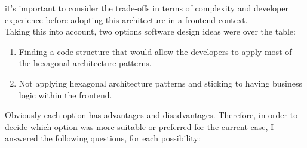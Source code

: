 \documentclass[../design.tex]{subfiles}
\begin{document}
it's important to consider the trade-offs in terms of complexity and developer
experience before adopting this architecture in a frontend context.
\\[8pt]
Taking this into account, two options software design ideas were over the table:
\begin{enumerate}
	\item Finding a code structure that would allow the developers to apply most
	      of the hexagonal architecture patterns.
	\item Not applying hexagonal architecture patterns and sticking to
	      having business logic within the frontend.
\end{enumerate}
Obviously each option has advantages and disadvantages. Therefore, in order to
decide which option was more suitable or preferred for the current case, I
answered the following questions, for each possibility:
\end{document}
